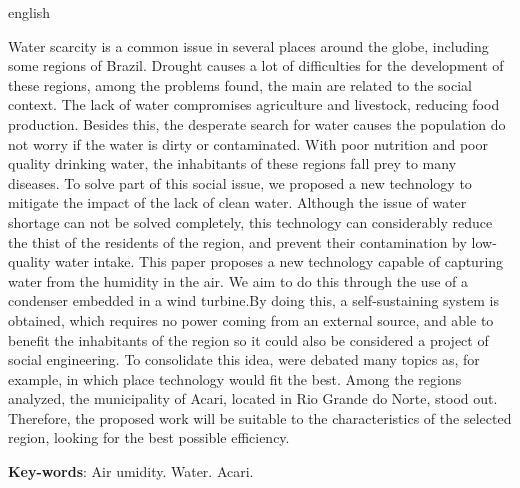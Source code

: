 \begin{resumo}[Abstract]
 \begin{otherlanguage*}{english}
   
   Water scarcity is a common issue in several places around the globe, including some regions of Brazil.
   Drought causes a lot of difficulties for the development of these regions, among the problems found, the main are related
   to the social context. The lack of water compromises agriculture and livestock, reducing food production.
   Besides this, the desperate search for water causes the population do not worry if the water is dirty or contaminated.
   With poor nutrition and poor quality drinking water, the inhabitants of these regions fall prey to many diseases.
   To solve part of this social issue, we proposed a new technology to mitigate the impact of the lack of clean water.
   Although the issue of water shortage can not be solved completely, this technology can considerably reduce the thist
   of the residents of the region, and prevent their contamination by low-quality water intake.
   This paper proposes a new technology capable of capturing water from the humidity in the air.
   We aim to do this through the use of a condenser embedded in a wind turbine.By doing this, a self-sustaining system
   is obtained, which requires no power coming from an external source, and able to benefit the inhabitants of the region
   so it could also be considered a project of social engineering. To consolidate this idea, were debated many topics as,
   for example, in which place technology would fit the best. Among the regions analyzed, the municipality of Acari,
   located in Rio Grande do Norte, stood out. Therefore, the proposed work will be suitable to the characteristics of the
   selected region, looking for the best possible efficiency.
   
   \vspace{\onelineskip}
 
   \noindent 
   \textbf{Key-words}: Air umidity. Water. Acari.
 \end{otherlanguage*}
\end{resumo}
